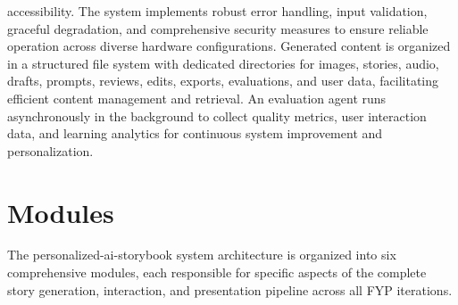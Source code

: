 accessibility. The system implements robust error handling, input validation, graceful degradation, and comprehensive security measures to ensure reliable operation across diverse hardware configurations. Generated content is organized in a structured file system with dedicated directories for images, stories, audio, drafts, prompts, reviews, edits, exports, evaluations, and user data, facilitating efficient content management and retrieval. An evaluation agent runs asynchronously in the background to collect quality metrics, user interaction data, and learning analytics for continuous system improvement and personalization.

\section{Modules}
The personalized-ai-storybook system architecture is organized into six comprehensive modules, each responsible for specific aspects of the complete story generation, interaction, and presentation pipeline across all FYP iterations.

